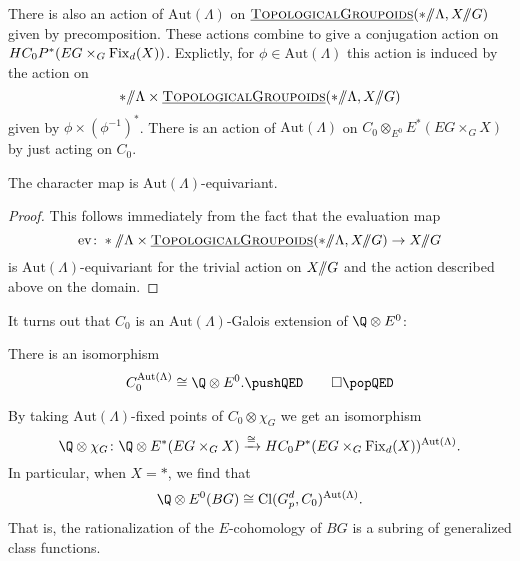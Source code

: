 There is also an action of \(\mathrm{Aut}(\Lambda)\) on \(\operatorname{\underline{\smash{\normalfont\textsc{TopologicalGroupoids}}}}(* /\!\!/ \Lambda, X /\!\!/ G)\) given by precomposition. These actions combine to give a conjugation action on \(HC_{0}P^{*}(EG \times_G \operatorname{Fix}_d(X))\). Explictly, for \(\phi \in \mathrm{Aut}(\Lambda)\) this action is induced by the action on 
\[
* /\!\!/ \Lambda \times \operatorname{\underline{\smash{\normalfont\textsc{TopologicalGroupoids}}}}(* /\!\!/ \Lambda, X /\!\!/ G)
\]
given by \(\phi \times (\phi^{-1})^*\). There is an action of \(\mathrm{Aut}(\Lambda)\) on \(C_0 \otimes_{E^0} E^*(EG \times_G X)\) by just acting on \(C_0\).



\begin{proposition}
The character map is \(\mathrm{Aut}(\Lambda)\)-equivariant.
\end{proposition}
\begin{proof}
This follows immediately from the fact that the evaluation map
\[
\mathrm{ev} \colon * \mmod \Lambda \times \InternalHom{TopologicalGroupoids}(* \mmod \Lambda, X \mmod G) \to X \mmod G
\]
is \(\mathrm{Aut}(\Lambda)\)-equivariant for the trivial action on \(X /\!\!/ G\) and the action described above on the domain.
\end{proof}

It turns out that \(C_0\) is an \(\mathrm{Aut}(\Lambda)\)-Galois extension of \(\Q \otimes E^0\):
\begin{proposition}
There is an isomorphism
\[
C_{0}^{\mathrm{Aut}(\Lambda)} \cong \Q \otimes E^0. \pushQED\qed \qedhere \popQED
\]
\end{proposition}

By taking \(\mathrm{Aut}(\Lambda)\)-fixed points of \(C_0 \otimes \chi_G\) we get an isomorphism
\[
\Q \otimes \chi_G \colon \Q \otimes E^*(EG \times_G X) \xrightarrow{\cong} HC_{0}P^{*}(EG \times_G \Fix_d(X))^{\mathrm{Aut}(\Lambda)}.
\]
In particular, when \(X = *\), we find that
\[
\Q \otimes E^0(BG) \cong \mathrm{Cl}(G_{p}^{d}, C_0)^{\mathrm{Aut}(\Lambda)}.
\]
That is, the rationalization of the \(E\)-cohomology of \(BG\) is a subring of generalized class functions.
